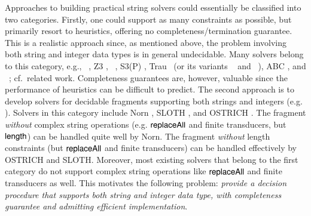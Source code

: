 Approaches to building practical string solvers could essentially be classified
into two categories. Firstly, one could support as many constraints as possible, but 
primarily resort to heuristics, 
offering no completeness/termination guarantee. This is a realistic approach 
since, as
mentioned above, the problem involving both string and integer data types is in 
general undecidable. Many solvers
belong to this category, e.g., 
{\cvc}~\cite{cvc4}, Z3 \cite{BTV09,Z3}, {\zthree}~\cite{Z3-str3}, S3(P) \cite{S3,TCJ16},
Trau~\cite{Abdulla17} (or its variants {\trauplus}~\cite{AbdullaA+19} and {\zthreetrau}~\cite{Z3-trau}), ABC \cite{ABC}, and \slent~\cite{WC+18}; cf.\ related work.
%
%
Completeness guarantees are, however, valuable since %
the 
performance of heuristics can be difficult to predict.
The second approach is to develop solvers for decidable fragments
supporting both strings and integers (e.g. %
\cite{Vijay-length,BFL13,Abdulla14,AbdullaA+19,LB16,CCH+18,CHL+19,HJLRV18}). 
Solvers in this category include Norn \cite{Abdulla14}, SLOTH
\cite{HJLRV18}, and OSTRICH \cite{CHL+19}. 
The fragment \emph{without} complex string operations (e.g. $\mathsf{replaceAll}$ and
finite transducers, but $\mathsf{length}$) can be handled quite well by Norn. The fragment \emph{without} length
constraints (but $\mathsf{replaceAll}$ and finite transducers)
can be handled effectively by OSTRICH and SLOTH. 
Moreover, most existing solvers that belong to the first category do not support
complex string operations like $\mathsf{replaceAll}$ and finite transducers as well.
This motivates the following problem: 
\emph{provide a decision procedure that supports both string and integer data type, with completeness guarantee and admitting efficient implementation}.

